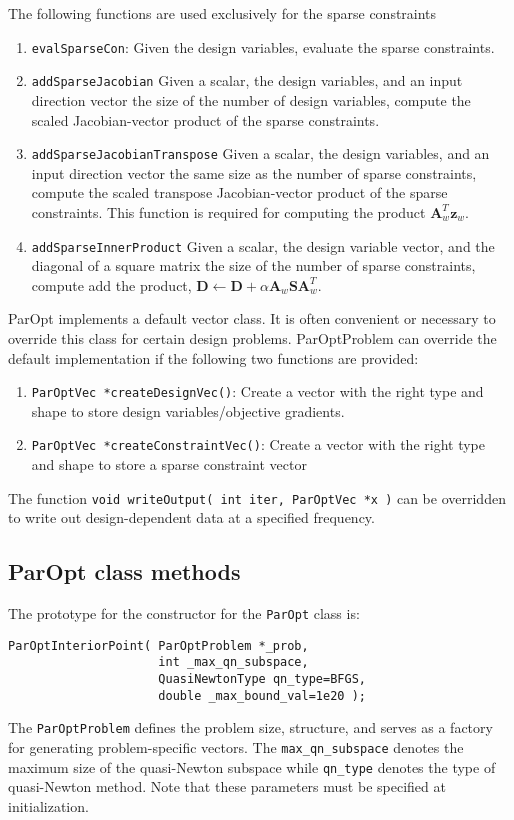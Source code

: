 \documentclass[12pt]{article}
\newcommand{\mb}{\mathbf}
\begin{document}
The following functions are used exclusively for the sparse constraints
%
\begin{enumerate}
\item \texttt{evalSparseCon}: Given the design variables, evaluate the sparse constraints.

\item \texttt{addSparseJacobian} Given a scalar, the design variables, and an input direction vector the size of the number of design variables, compute the scaled Jacobian-vector product of the sparse constraints.

\item \texttt{addSparseJacobianTranspose} Given a scalar, the design variables, and an input direction vector the same size as the number of sparse constraints, compute the scaled transpose Jacobian-vector product of the sparse constraints. This function is required for computing the product $\mb{A}_{w}^{T}\mb{z}_{w}$.

\item \texttt{addSparseInnerProduct} Given a scalar, the design variable vector, and the diagonal of a square matrix the size of the number of sparse constraints, compute add the product, $\mb{D} \leftarrow \mb{D} + \alpha \mb{A}_{w} \mb{S}\mb{A}_{w}^{T}$.
\end{enumerate}


ParOpt implements a default vector class. 
It is often convenient or necessary to override this class for certain design problems.
ParOptProblem can override the default implementation if the following two functions are provided:
\begin{enumerate}
\item \texttt{ParOptVec *createDesignVec()}: Create a vector with the right type and shape to store design variables/objective gradients.
\item \texttt{ParOptVec *createConstraintVec()}: Create a vector with the right type and shape to store a sparse constraint vector
\end{enumerate}  

The function \texttt{void writeOutput( int iter, ParOptVec *x )} can be overridden to write out design-dependent data at a specified frequency.
  
\subsection{ParOpt class methods}

The prototype for the constructor for the \texttt{ParOpt} class is:
%
\begin{verbatim}
ParOptInteriorPoint( ParOptProblem *_prob,
                     int _max_qn_subspace,
                     QuasiNewtonType qn_type=BFGS,
                     double _max_bound_val=1e20 );
\end{verbatim}
%
The \texttt{ParOptProblem} defines the problem size, structure, and serves as a factory for generating problem-specific vectors.
The \texttt{max\_qn\_subspace} denotes the maximum size of the quasi-Newton subspace while \texttt{qn\_type} denotes the type of quasi-Newton method. Note that these parameters must be specified at initialization.
\end{document}
